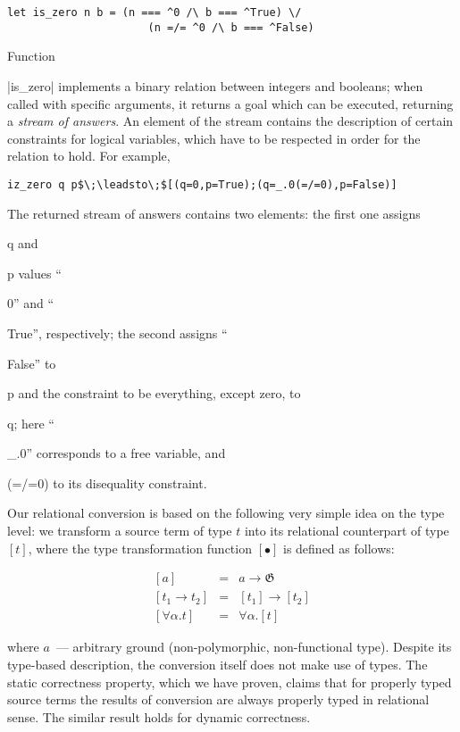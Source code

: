 \documentclass[10pt, oneside, nocopyrightspace]{sigplanconf}
\newcommand{\G}{\mathfrak G}
\newcommand{\miniKanren}{\texttt{miniKanren}\xspace}
\newcommand*{\SavedLstInline}{}
\DeclareRobustCommand*{\lstinline}{%
  \ifmmode
    \let\SavedBGroup\bgroup
    \def\bgroup{%
      \let\bgroup\SavedBGroup
      \hbox\bgroup
    }%
  \fi
  \SavedLstInline
}
\begin{document}
\begin{lstlisting}[basicstyle=\small]
   let is_zero n b = (n === ^0 /\ b === ^True) \/ 
                      (n =/= ^0 /\ b === ^False)
\end{lstlisting}

Function \lstinline|is_zero| implements a binary relation between integers and booleans; when called with specific arguments, it
returns a goal which can be executed, returning a \emph{stream of answers}. An element of the stream contains the description of 
certain constraints for logical variables, which have to be respected in order for the relation to hold. For example,

\begin{lstlisting}[basicstyle=\small]
   iz_zero q p$\;\leadsto\;$[(q=0,p=True);(q=_.0(=/=0),p=False)]
\end{lstlisting}

The returned stream of answers contains two elements: the first one assigns \lstinline{q} and \lstinline{p} values 
``\lstinline{0}'' and ``\lstinline{True}'', respectively; the second assigns ``\lstinline{False}'' to \lstinline{p} 
and the constraint to be everything, except zero, to \lstinline{q}; here ``\lstinline{_.0}'' corresponds to a free
variable, and \lstinline{(=/=0)} to its disequality constraint.

Our relational conversion is based on the following very simple idea on the type level: we transform a source
term of type $t$ into its relational counterpart of type $[t]$, where the type transformation function $[\bullet]$ 
is defined as follows:

$$
\begin{array}{rcl}
\left[a\right]              &=&a\to\G\\
\left[t_1\to t_2\right]     &=&\left[t_1\right]\to\left[t_2\right]\\
\left[\forall\alpha.t\right]&=&\forall\alpha.\left[t\right]
\end{array}
$$

\noindent where $a$~--- arbitrary ground (non-polymorphic, non-functional type). Despite its type-based description, 
the conversion itself does not make use of types. The static correctness property, which we have proven, claims that
for properly typed source terms the results of conversion are always properly typed in relational sense. The similar
result holds for dynamic correctness.

\end{document}
